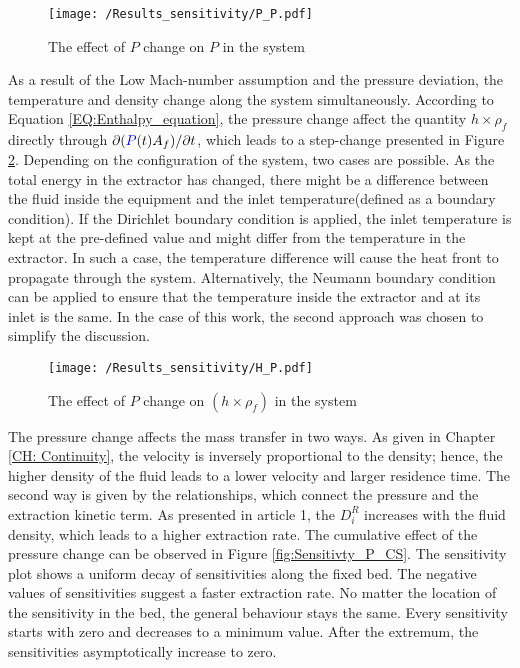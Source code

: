 \documentclass[../Article_Model_Parameters.tex]{subfiles}
\begin{document}
    \begin{figure}[h!]
    	\centering
    	\texttt{[image: /Results\_sensitivity/P\_P.pdf]}
    	\caption{The effect of $P$ change on $P$ in the system}
    	\label{fig:Sensitivty_P_P}
    \end{figure}
    
	As a result of the Low Mach-number assumption and the pressure deviation, the temperature and density change along the system simultaneously. According to Equation \ref{EQ:Enthalpy_equation}, the pressure change affect the quantity $h \times \rho_f$ directly through $\partial ({\color{blue}P}(t) A_f) / \partial t$, which leads to a step-change presented in Figure \ref{fig:Sensitivty_P_H}. Depending on the configuration of the system, two cases are possible. As the total energy in the extractor has changed, there might be a difference between the fluid inside the equipment and the inlet temperature(defined as a boundary condition). If the Dirichlet boundary condition is applied, the inlet temperature is kept at the pre-defined value and might differ from the temperature in the extractor. In such a case, the temperature difference will cause the heat front to propagate through the system. Alternatively, the Neumann boundary condition can be applied to ensure that the temperature inside the extractor and at its inlet is the same. In the case of this work, the second approach was chosen to simplify the discussion.
    
    \begin{figure}[h!]
    	\centering
    	\texttt{[image: /Results\_sensitivity/H\_P.pdf]}
    	\caption{The effect of $P$ change on $(h \times \rho_f)$ in the system}
    	\label{fig:Sensitivty_P_H}
    \end{figure}

	The pressure change affects the mass transfer in two ways. As given in Chapter \ref{CH: Continuity}, the velocity is inversely proportional to the density; hence, the higher density of the fluid leads to a lower velocity and larger residence time. The second way is given by the relationships, which connect the pressure and the extraction kinetic term. As presented in {\color{red}article 1}, the $D_i^R$ increases with the fluid density, which leads to a higher extraction rate. The cumulative effect of the pressure change can be observed in Figure \ref{fig:Sensitivty_P_CS}. The sensitivity plot shows a uniform decay of sensitivities along the fixed bed. The negative values of sensitivities suggest a faster extraction rate. No matter the location of the sensitivity in the bed, the general behaviour stays the same. Every sensitivity starts with zero and decreases to a minimum value. After the extremum, the sensitivities asymptotically increase to zero.
\end{document}
